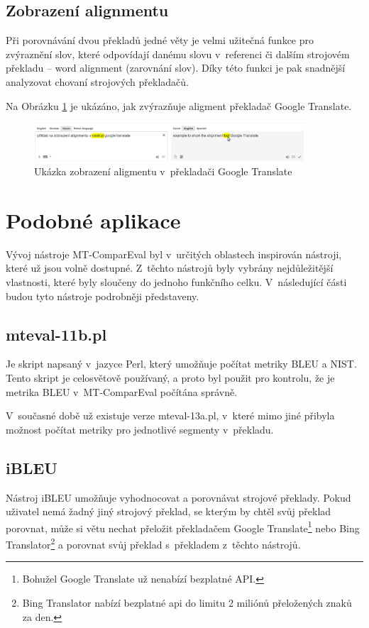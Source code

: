 \subsection{Zobrazení alignmentu}
Při porovnávání dvou překladů jedné věty je velmi užitečná funkce pro zvýraznění slov,
  které odpovídají danému slovu v~referenci či dalším strojovém překladu -- word alignment (zarovnání slov).
Díky této funkci je pak snadnější analyzovat chovaní strojových překladačů.

Na Obrázku \ref{img:alignment} je ukázáno, jak zvýrazňuje aligment překladač Google Translate.
\begin{figure}
	\center
	\includegraphics[width=0.9\textwidth]{img/alignment.eps}
	\caption{Ukázka zobrazení aligmentu v~překladači Google Translate}
	\label{img:alignment}
\end{figure}

\section{Podobné aplikace}
Vývoj nástroje \mbox{MT-ComparEval} byl v~určitých oblastech inspirován nástroji,
  které už jsou volně dostupné.
Z~těchto nástrojů byly vybrány nejdůležitější vlastnosti,
  které byly sloučeny do jednoho funkčního celku.
V~následující části budou tyto nástroje podrobněji představeny.

\subsection{mteval-11b.pl}
Je skript napsaný v~jazyce Perl,
  který umožňuje počítat metriky BLEU a NIST.
Tento skript je celosvětově používaný,
  a proto byl použit pro kontrolu,
  že je metrika BLEU v~\mbox{MT-ComparEval} počítána správně.

V~současné době už existuje verze mteval-13a.pl,
  v~které mimo jiné přibyla možnost počítat metriky pro jednotlivé segmenty v~překladu.

\subsection{iBLEU}
Nástroj iBLEU umožňuje vyhodnocovat a porovnávat strojové překlady.
Pokud uživatel nemá žadný jiný strojový překlad,
  se kterým by chtěl svůj překlad porovnat,
  může si větu nechat přeložit překladačem Google Translate\footnote{
    Bohužel Google Translate už nenabízí bezplatné API.
  } nebo Bing Translator\footnote{
    Bing Translator nabízí bezplatné api do limitu 2 miliónů přeložených znaků za den.
  }
  a porovnat svůj překlad s~překladem z~těchto nástrojů.

